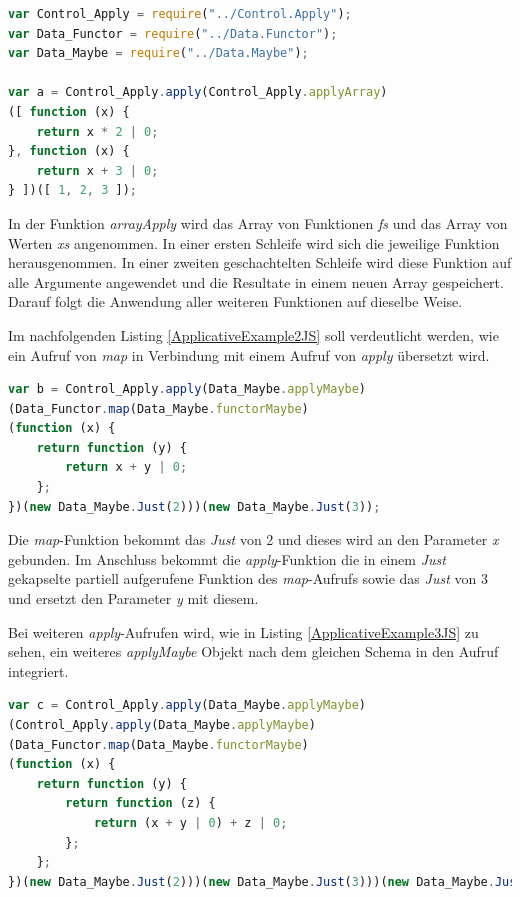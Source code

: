 \documentclass[
12pt,
ngerman,
oneside]
{scrbook} %
\begin{document}
\begin{lstlisting}[language=javascript, style=numbered-and-boxed, caption=Übersetzung von Applicatives mit Arrays nach JS, label=ApplicativeExample1JS]
var Control_Apply = require("../Control.Apply");
var Data_Functor = require("../Data.Functor");
var Data_Maybe = require("../Data.Maybe");

var a = Control_Apply.apply(Control_Apply.applyArray)
([ function (x) {
	return x * 2 | 0;
}, function (x) {
	return x + 3 | 0;
} ])([ 1, 2, 3 ]);
\end{lstlisting}

In der Funktion \emph{arrayApply} wird das Array von Funktionen \emph{fs} und das Array von Werten \emph{xs} angenommen. In einer ersten Schleife wird sich die jeweilige Funktion herausgenommen. In einer zweiten geschachtelten Schleife wird diese Funktion auf alle Argumente angewendet und die Resultate in einem neuen Array gespeichert. Darauf folgt die Anwendung aller weiteren Funktionen auf dieselbe Weise.

Im nachfolgenden Listing \ref{ApplicativeExample2JS} soll verdeutlicht werden, wie ein Aufruf von \emph{map} in Verbindung mit einem Aufruf von \emph{apply} übersetzt wird.

\begin{lstlisting}[language=javascript, style=numbered-and-boxed, caption=Übersetzung von Applicatives mit Maybe nach JS, label=ApplicativeExample2JS]
var b = Control_Apply.apply(Data_Maybe.applyMaybe)
(Data_Functor.map(Data_Maybe.functorMaybe)
(function (x) {
	return function (y) {
		return x + y | 0;
	};
})(new Data_Maybe.Just(2)))(new Data_Maybe.Just(3));
\end{lstlisting}

Die \emph{map}-Funktion bekommt das \emph{Just} von 2 und dieses wird an den Parameter \emph{x} gebunden. Im Anschluss bekommt die \emph{apply}-Funktion die in einem \emph{Just} gekapselte partiell aufgerufene Funktion des \emph{map}-Aufrufs sowie das \emph{Just} von 3 und ersetzt den Parameter \emph{y} mit diesem.

Bei weiteren \emph{apply}-Aufrufen wird, wie in Listing \ref{ApplicativeExample3JS} zu sehen, ein weiteres \emph{applyMaybe} Objekt nach dem gleichen Schema in den Aufruf integriert.

\begin{lstlisting}[language=javascript, style=numbered-and-boxed, caption=Übersetzung von Applicatives mit Maybe nach JS, label=ApplicativeExample3JS]
var c = Control_Apply.apply(Data_Maybe.applyMaybe)
(Control_Apply.apply(Data_Maybe.applyMaybe)
(Data_Functor.map(Data_Maybe.functorMaybe)
(function (x) {
	return function (y) {
		return function (z) {
			return (x + y | 0) + z | 0;
		};
	};
})(new Data_Maybe.Just(2)))(new Data_Maybe.Just(3)))(new Data_Maybe.Just(5));
\end{lstlisting}
\end{document}
